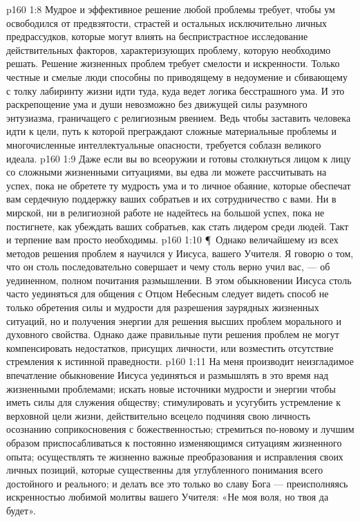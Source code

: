 \vs p160 1:8 Мудрое и эффективное решение любой проблемы требует, чтобы ум освободился от предвзятости, страстей и остальных исключительно личных предрассудков, которые могут влиять на беспристрастное исследование действительных факторов, характеризующих проблему, которую необходимо решать. Решение жизненных проблем требует смелости и искренности. Только честные и смелые люди способны по приводящему в недоумение и сбивающему с толку лабиринту жизни идти туда, куда ведет логика бесстрашного ума. И это раскрепощение ума и души невозможно без движущей силы разумного энтузиазма, граничащего с религиозным рвением. Ведь чтобы заставить человека идти к цели, путь к которой преграждают сложные материальные проблемы и многочисленные интеллектуальные опасности, требуется соблазн великого идеала.
\vs p160 1:9 Даже если вы во всеоружии и готовы столкнуться лицом к лицу со сложными жизненными ситуациями, вы едва ли можете рассчитывать на успех, пока не обретете ту мудрость ума и то личное обаяние, которые обеспечат вам сердечную поддержку ваших собратьев и их сотрудничество с вами. Ни в мирской, ни в религиозной работе не надейтесь на большой успех, пока не постигнете, как убеждать ваших собратьев, как стать лидером среди людей. Такт и терпение вам просто необходимы.
\vs p160 1:10 \P\ Однако величайшему из всех методов решения проблем я научился у Иисуса, вашего Учителя. Я говорю о том, что он столь последовательно совершает и чему столь верно учил вас, --- об уединенном, полном почитания размышлении. В этом обыкновении Иисуса столь часто уединяться для общения с Отцом Небесным следует видеть способ не только обретения силы и мудрости для разрешения заурядных жизненных ситуаций, но и получения энергии для решения высших проблем морального и духовного свойства. Однако даже правильные пути решения проблем не могут компенсировать недостатков, присущих личности, или возместить отсутствие стремления к истинной праведности.
\vs p160 1:11 На меня производит неизгладимое впечатление обыкновение Иисуса уединяться и размышлять в это время над жизненными проблемами; искать новые источники мудрости и энергии чтобы иметь силы для служения обществу; стимулировать и усугубить устремление к верховной цели жизни, действительно всецело подчиняя свою личность осознанию соприкосновения с божественностью; стремиться по\hyp{}новому и лучшим образом приспосабливаться к постоянно изменяющимся ситуациям жизненного опыта; осуществлять те жизненно важные преобразования и исправления своих личных позиций, которые существенны для углубленного понимания всего достойного и реального; и делать все это только во славу Бога --- преисполняясь искренностью любимой молитвы вашего Учителя: «Не моя воля, но твоя да будет».
